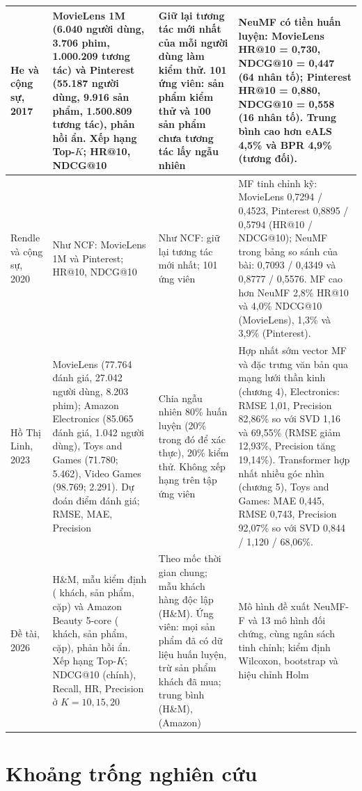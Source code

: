 \begin{xltabular}{\textwidth}{|>{\raggedright\arraybackslash}p{2.2cm}|>{\raggedright\arraybackslash}p{4.1cm}|>{\raggedright\arraybackslash}p{3.3cm}|>{\raggedright\arraybackslash}X|}
    \endfoot
    He và cộng sự, 2017 & MovieLens 1M (6.040 người dùng, 3.706 phim, 1.000.209 tương tác) và Pinterest (55.187 người dùng, 9.916 sản phẩm, 1.500.809 tương tác), phản hồi ẩn. Xếp hạng Top-$K$; HR@10, NDCG@10 & Giữ lại tương tác mới nhất của mỗi người dùng làm kiểm thử. 101 ứng viên: sản phẩm kiểm thử và 100 sản phẩm chưa tương tác lấy ngẫu nhiên & NeuMF có tiền huấn luyện: MovieLens HR@10 = 0,730, NDCG@10 = 0,447 (64 nhân tố); Pinterest HR@10 = 0,880, NDCG@10 = 0,558 (16 nhân tố). Trung bình cao hơn eALS 4,5\% và BPR 4,9\% (tương đối). \\
    \hline
    Rendle và cộng sự, 2020 & Như NCF: MovieLens 1M và Pinterest; HR@10, NDCG@10 & Như NCF: giữ lại tương tác mới nhất; 101 ứng viên & MF tinh chỉnh kỹ: MovieLens 0,7294 / 0,4523, Pinterest 0,8895 / 0,5794 (HR@10 / NDCG@10); NeuMF trong bảng so sánh của bài: 0,7093 / 0,4349 và 0,8777 / 0,5576. MF cao hơn NeuMF 2,8\% HR@10 và 4,0\% NDCG@10 (MovieLens), 1,3\% và 3,9\% (Pinterest). \\
    \hline
    Hồ Thị Linh, 2023 & MovieLens (77.764 đánh giá, 27.042 người dùng, 8.203 phim); Amazon Electronics (85.065 đánh giá, 1.042 người dùng), Toys and Games (71.780; 5.462), Video Games (98.769; 2.291). Dự đoán điểm đánh giá; RMSE, MAE, Precision & Chia ngẫu nhiên 80\% huấn luyện (20\% trong đó để xác thực), 20\% kiểm thử. Không xếp hạng trên tập ứng viên & Hợp nhất sớm vector MF và đặc trưng văn bản qua mạng lưới thần kinh (chương 4), Electronics: RMSE 1,01, Precision 82,86\% so với SVD 1,16 và 69,55\% (RMSE giảm 12,93\%, Precision tăng 19,14\%). Transformer hợp nhất nhiều góc nhìn (chương 5), Toys and Games: MAE 0,445, RMSE 0,743, Precision 92,07\% so với SVD 0,844 / 1,120 / 68,06\%. \\
    \hline
    Đề tài, 2026 & H\&M, mẫu kiểm định ( khách,  sản phẩm,  cặp) và Amazon Beauty 5-core ( khách,  sản phẩm,  cặp), phản hồi ẩn. Xếp hạng Top-$K$; NDCG@10 (chính), Recall, HR, Precision ở $K = 10, 15, 20$ & Theo mốc thời gian chung; mẫu khách hàng độc lập (H\&M). Ứng viên: mọi sản phẩm đã có dữ liệu huấn luyện, trừ sản phẩm khách đã mua; trung bình  (H\&M),  (Amazon) & Mô hình đề xuất NeuMF-F và 13 mô hình đối chứng, cùng ngân sách tinh chỉnh; kiểm định Wilcoxon, bootstrap và hiệu chỉnh Holm \\ \hline
\end{xltabular}
\endgroup

\section{Khoảng trống nghiên cứu}
\label{sec:khoangtrong_nghiencuu}


